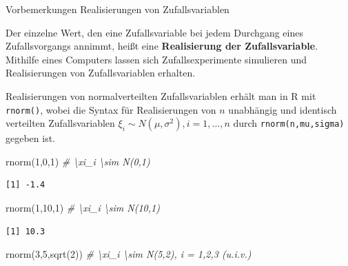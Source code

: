 \documentclass[
  8pt,
  ignorenonframetext,
]{beamer}
\newenvironment{Shaded}{\begin{snugshade}}{\end{snugshade}}
\newcommand{\CommentTok}[1]{\textcolor[rgb]{0.56,0.35,0.01}{\textit{#1}}}
\newcommand{\DecValTok}[1]{\textcolor[rgb]{0.00,0.00,0.81}{#1}}
\newcommand{\FunctionTok}[1]{\textcolor[rgb]{0.00,0.00,0.00}{#1}}
\newcommand{\NormalTok}[1]{#1}
\begin{document}
\begin{frame}[fragile]{Vorbemerkungen}
\protect\hypertarget{vorbemerkungen}{}
Realisierungen von Zufallsvariablen

\footnotesize
\justifying

Der einzelne Wert, den eine Zufallsvariable bei jedem Durchgang eines
Zufallsvorgangs annimmt, heißt eine \textbf{Realisierung der
Zufallsvariable}. Mithilfe eines Computers lassen sich
Zufallsexperimente simulieren und Realisierungen von Zufallsvariablen
erhalten.

Realisierungen von normalverteilten Zufallsvariablen erhält man in R mit
\texttt{rnorm()}, wobei die Syntax für Realisierungen von \(n\)
unabhängig und identisch verteilten Zufallsvariablen
\(\xi_i \sim N(\mu,\sigma^2), i = 1,...,n\) durch
\texttt{rnorm(n,mu,sigma)} gegeben ist.

\vspace{2mm}

\begin{Shaded}
\begin{Highlighting}[]
\FunctionTok{rnorm}\NormalTok{(}\DecValTok{1}\NormalTok{,}\DecValTok{0}\NormalTok{,}\DecValTok{1}\NormalTok{)                    }\CommentTok{\# \textbackslash{}xi\_i \textbackslash{}sim N(0,1)}
\end{Highlighting}
\end{Shaded}

\begin{verbatim}
[1] -1.4
\end{verbatim}

\begin{Shaded}
\begin{Highlighting}[]
\FunctionTok{rnorm}\NormalTok{(}\DecValTok{1}\NormalTok{,}\DecValTok{10}\NormalTok{,}\DecValTok{1}\NormalTok{)                   }\CommentTok{\# \textbackslash{}xi\_i \textbackslash{}sim N(10,1)}
\end{Highlighting}
\end{Shaded}

\begin{verbatim}
[1] 10.3
\end{verbatim}

\begin{Shaded}
\begin{Highlighting}[]
\FunctionTok{rnorm}\NormalTok{(}\DecValTok{3}\NormalTok{,}\DecValTok{5}\NormalTok{,}\FunctionTok{sqrt}\NormalTok{(}\DecValTok{2}\NormalTok{))              }\CommentTok{\# \textbackslash{}xi\_i \textbackslash{}sim N(5,2), i = 1,2,3 (u.i.v.)}
\end{Highlighting}
\end{Shaded}


\end{frame}
\end{document}
